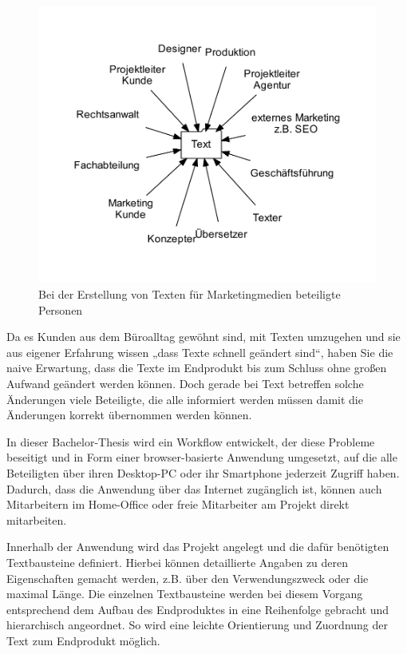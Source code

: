 \documentclass[11pt,a4paper]{article}
\begin{document}
\begin{figure}[htb]
\begin{center}
\includegraphics[width=\textwidth]{media/chart-2.pdf}
\end{center}
\caption{Bei der Erstellung von Texten für Marketingmedien beteiligte Personen}
\label{chart:2}
\end{figure}

Da es Kunden aus dem Büroalltag gewöhnt sind, mit Texten umzugehen und sie aus eigener Erfahrung wissen „dass Texte schnell geändert sind“, haben Sie die naive Erwartung, dass die Texte im Endprodukt bis zum Schluss ohne großen Aufwand geändert werden können. Doch gerade bei Text betreffen solche Änderungen viele Beteiligte, die alle informiert werden müssen damit die Änderungen korrekt übernommen werden können.

In dieser Bachelor-Thesis wird ein Workflow entwickelt, der diese Probleme beseitigt und in Form einer browser-basierte Anwendung umgesetzt, auf die alle Beteiligten über ihren Desktop-PC oder ihr Smartphone jederzeit Zugriff haben. Dadurch, dass die Anwendung über das Internet zugänglich ist, können auch Mitarbeitern im Home-Office oder freie Mitarbeiter am Projekt direkt mitarbeiten.

Innerhalb der Anwendung wird das Projekt angelegt und die dafür benötigten Textbausteine definiert. Hierbei können detaillierte Angaben zu deren Eigenschaften gemacht werden, z.B. über den Verwendungszweck oder die maximal Länge. Die einzelnen Textbausteine werden bei diesem Vorgang entsprechend dem Aufbau des Endproduktes in eine Reihenfolge gebracht und hierarchisch angeordnet. So wird eine leichte Orientierung und Zuordnung der Text zum Endprodukt möglich. 
\end{document}
